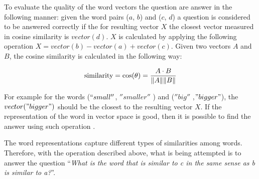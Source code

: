 To evaluate the quality of the word vectors the question  are answer in the
following manner: given the word pairs ($a$, $b$) and ($c$, $d$) a question
is considered to be answered correctly if the for resulting vector $X$ the closest vector measured in
cosine similarity is  $vector(d)$. $X$ is calculated by applying the following
operation $X = vector(b) - vector(a) + vector(c)$.  Given two vectors $A$ and $B$, the
cosine similarity is calculated in the following way: 

$$\text{similarity} = \cos(\theta) = {A \cdot B \over \|A\| \|B\|}$$


 For example  for the words
($``small''$, $''smaller''$ ) and ($''big''$ ,$"bigger"$),
the $vector("bigger")$ should be the closest to the resulting
vector $X$. If the representation of the word in
vector space is good, then it is possible to find the answer using such
operation \cite{DBLP:journals/corr/abs-1301-3781}.

The word representations capture different types of  similarities among words. Therefore, with the
operation described above,  what is  being
attempted is to answer the question ``\emph{What is the word that is similar to
c in the same sense as b is similar to a?}''. 

\renewcommand{\arraystretch}{1.3}

